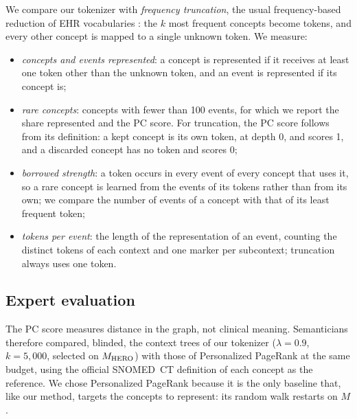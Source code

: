 We compare our tokenizer with \emph{frequency truncation}, the usual frequency-based reduction of EHR vocabularies \cite{steinberg2021language}: the $k$ most frequent concepts become tokens, and every other concept is mapped to a single unknown token.
We measure:
\begin{itemize}
    \item \emph{concepts and events represented}: a concept is represented if it receives at least one token other than the unknown token, and an event is represented if its concept is;
    \item \emph{rare concepts}: concepts with fewer than 100 events, for which we report the share represented and the PC score. For truncation, the PC score follows from its definition: a kept concept is its own token, at depth 0, and scores 1, and a discarded concept has no token and scores 0;
    \item \emph{borrowed strength}: a token occurs in every event of every concept that uses it, so a rare concept is learned from the events of its tokens rather than from its own; we compare the number of events of a concept with that of its least frequent token;
    \item \emph{tokens per event}: the length of the representation of an event, counting the distinct tokens of each context and one marker per subcontext; truncation always uses one token.
\end{itemize}

\subsection{Expert evaluation}
\label{sec:method:expert}

The PC score measures distance in the graph, not clinical meaning.
Semanticians therefore compared, blinded, the context trees of our tokenizer ($\lambda = 0.9$, $k = 5{,}000$, selected on $M_{\mathrm{HERO}}$) with those of Personalized PageRank at the same budget, using the official SNOMED~CT definition of each concept as the reference.
We chose Personalized PageRank because it is the only baseline that, like our method, targets the concepts to represent: its random walk restarts on $M$. 


